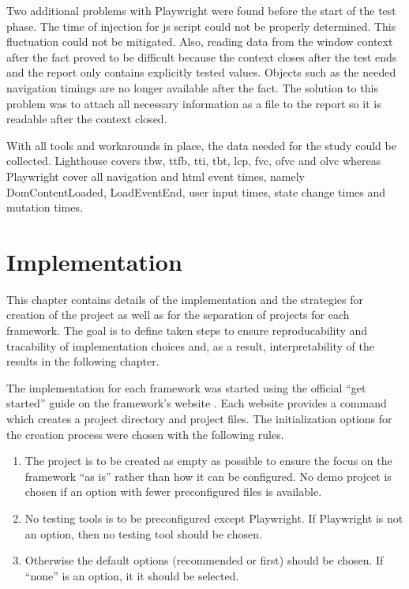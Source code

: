 \documentclass[a4paper, 10pt]{article}
\begin{document}
Two additional problems with Playwright were found before the start of the test phase.
The time of injection for \acrshort{js} script could not be properly determined.
This fluctuation could not be mitigated.
Also, reading data from the window context after the fact proved to be difficult because the context closes after the test ends and the report only contains explicitly tested values.
Objects such as the needed navigation timings are no longer available after the fact.
The solution to this problem was to attach all necessary information as a file to the report so it is readable after the context closed.

With all tools and workarounds in place, the data needed for the study could be collected.
Lighthouse covers \acrshort{tbw}, \acrshort{ttfb}, \acrshort{tti}, \acrshort{tbt}, \acrshort{lcp}, \acrshort{fvc}, \acrshort{ofvc} and \acrshort{olvc} whereas Playwright cover all navigation and \acrshort{html} event times, namely DomContentLoaded, LoadEventEnd, user input times, state change times and mutation times.

\section{Implementation}\label{sec:implementation} 
% 

This chapter contains details of the implementation and the strategies for creation of the project as well as for the separation of projects for each framework.
The goal is to define taken steps to ensure reproducability and tracability of implementation choices and, as a result, interpretability of the results in the following chapter.

The implementation for each framework was started using the official \enquote{get started} guide on the framework's website \citep{AngularGetStarted,AstroGetStarted,NextGetStarted,NuxtGetStarted,ReactGetStarted,SvelteGetStarted,VueGetStarted}.
Each website provides a command which creates a project directory and project files.
The initialization options for the creation process were chosen with the following rules.

\begin{enumerate}
  \item The project is to be created as empty as possible to ensure the focus on the framework \enquote{as is} rather than how it can be configured.
  No demo projcet is chosen if an option with fewer preconfigured files is available.
  \item No testing tools is to be preconfigured except Playwright.
  If Playwright is not an option, then no testing tool should be chosen.
  \item Otherwise the default options (recommended or first) should be chosen.
  If \enquote{none} is an option, it it should be selected.
\end{enumerate}
\end{document}
